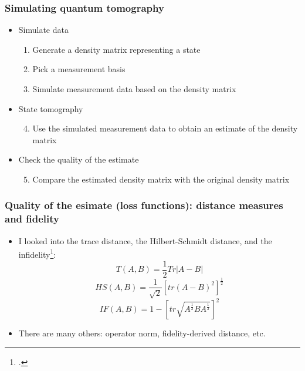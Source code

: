\documentclass{beamer}
\begin{document}
\begin{frame}
  \frametitle{Simulating quantum tomography}
  \begin{itemize}
  \item{ Simulate data
      \begin{enumerate}
      \item Generate a density matrix representing a state
      \item Pick a measurement basis
      \item Simulate measurement data based on the density matrix
      \end{enumerate}
  }
  \item{State tomography
    \begin{enumerate}
        \setcounter{enumi}{3}
      \item {\color{blue}Use the simulated measurement data to obtain an estimate of the density matrix}
      \end{enumerate}
    }
  \item{Check the quality of the estimate
    \begin{enumerate}
        \setcounter{enumi}{4}
      \item Compare the estimated density matrix with the original density matrix
      \end{enumerate}
    }
  \end{itemize}
\end{frame}

\begin{frame}
  \frametitle{Quality of the esimate (loss functions): distance measures and fidelity}
  \begin{itemize}
  \item{
      I looked into the trace distance, the Hilbert-Schmidt distance, and the infidelity\footcite{PhysRevLett.111.160406}:
      \begin{equation}T(A,B) = \frac{1}{2} Tr|A - B|\end{equation}
      \begin{equation}HS(A,B) = \frac{1}{\sqrt{2}} \left[tr(A - B)^2\right]^{\frac{1}{2}}\end{equation}
      \begin{equation}IF(A,B) = 1 - \left[tr\sqrt{A^{\frac{1}{2}}BA^{\frac{1}{2}}}\right]^2\end{equation}
    }
  \item{There are many others: operator norm, fidelity-derived distance, etc.}
  \end{itemize}
\end{frame}
\end{document}
